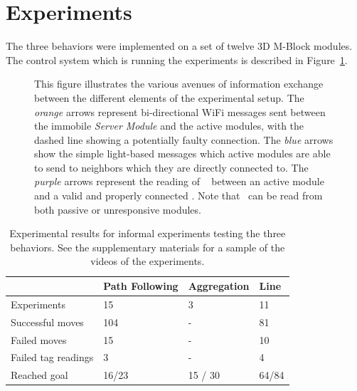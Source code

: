 \section{Experiments}
\label{sec:Experiments}

The three behaviors were implemented on a set of twelve 3D M-Block modules. The control system which is running the experiments is described in Figure~\ref{fig:electroncsChart}.

\begin{figure}[ht]

	
	
\caption{This figure illustrates the various avenues of information exchange between the different elements of the experimental setup. The \emph{orange} arrows represent bi-directional WiFi messages sent between the immobile \emph{Server Module} and the active modules, with the dashed line showing a potentially faulty connection. The \emph{blue} arrows show the simple light-based messages which active modules are able to send to neighbors which they are directly connected to. The \emph{purple} arrows represent the reading of \tagNamePlural~ between an active module and a valid and properly connected \tagName. Note that \tagNamePlural~can be read from both passive or unresponsive modules.}
	
	\label{fig:electroncsChart}
\end{figure}

\begin{table}[h]
	\caption{Experimental results for informal experiments testing the three behaviors. See the supplementary materials for a sample of the videos of the experiments.}
	
	\begin{tabular}{ p{2.4cm}  p{1.8cm}  p{1.4cm} p{1.3cm} }
		\hline
								& Path Following& Aggregation 	& Line		\\
		\hline
		Experiments				&  15 			& 3				& 11 		\\
		Successful moves		&  104			& -				& 81			\\
		Failed moves			&  15			& -				& 10			\\
		Failed tag readings		&  3			& -				& 4			\\
		Reached goal				&  16/23		& 15 / 30		& 64/84		\\

		
		
		
		
		
		
	\end{tabular}
	
	\label{tab:info}
\end{table}

